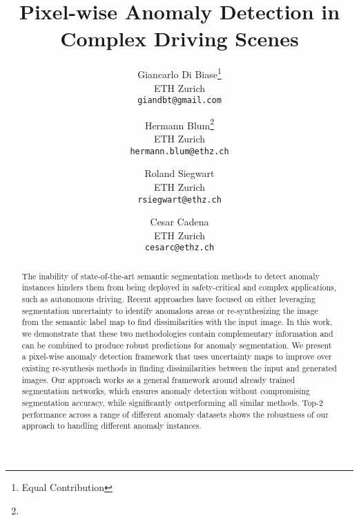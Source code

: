 \documentclass[final]{cvpr}
\title{Pixel-wise Anomaly Detection in Complex Driving Scenes}
\author{Giancarlo Di Biase\footnote[1]{Equal Contribution}\\
ETH Zurich\\
{\tt\small giandbt@gmail.com}
\and
Hermann Blum\footnote[1]{}\\
ETH Zurich\\
{\tt\small hermann.blum@ethz.ch}

\and
Roland Siegwart\\
ETH Zurich\\
{\tt\small rsiegwart@ethz.ch}

\and
Cesar Cadena\\
ETH Zurich\\
{\tt\small cesarc@ethz.ch}
}
\renewcommand{\thefootnote}{\fnsymbol{footnote}}
\begin{document}

\begin{abstract}
   The inability of state-of-the-art semantic segmentation methods to detect anomaly instances hinders them from being deployed in safety-critical and complex applications, such as autonomous driving.
   Recent approaches have focused on either leveraging segmentation uncertainty to identify anomalous areas or re-synthesizing the image from the semantic label map to find dissimilarities with the input image.
   In this work, we demonstrate that these two methodologies contain complementary information and can be combined to produce robust predictions for anomaly segmentation. 
   We present a pixel-wise anomaly detection framework that uses uncertainty maps to improve over existing re-synthesis methods in finding dissimilarities between the input and generated images. 
   Our approach works as a general framework around already trained segmentation networks, which ensures anomaly detection without compromising segmentation accuracy, while significantly outperforming all similar methods.  
Top-2 performance across a range of different anomaly datasets shows the robustness of our approach to handling different anomaly instances.


\vspace{-3mm}
\end{abstract}
\let\thefootnote\relax{}
\end{document}
